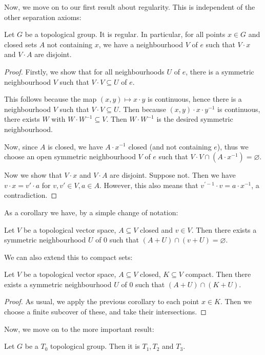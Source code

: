 \documentclass[twoside,symmetric, openany, 12pt]{./tuftebook}
\theoremstyle{definition}
\theoremstyle{definition}
\theoremstyle{definition}
\begin{document}
Now, we move on to our first result about regularity. This is independent of the other separation axioms:
\begin{Theorem}
	Let $G$ be a topological group. It is regular. In particular, for all points $x\in G$ and closed sets $A$ not containing $x$, we have a neighbourhood $V$ of $e$ such that $V\cdot x$ and $V\cdot A$ are disjoint.
\end{Theorem}
\begin{proof}
Firstly, we show that for all neighbourhoods $U$ of $e$, there is a symmetric neighbourhood $V$ such that $V\cdot V\subseteq U$ of $e$.	

This follows because the map $(x,y)\mapsto x\cdot y$ is continuous, hence there is a neighbourhood $V$ such that $V\cdot V\subseteq U$. Then because $(x,y)\cdot x\cdot y^{-1}$ is continuous, there exists $W$ with $W\cdot W^{-1}\subseteq V$. Then $W \cdot W^{-1}$ is the desired symmetric neighbourhood.

Now, since $A$ is closed, we have $A\cdot x^{-1}$ closed (and not containing $e$), thus we choose an open symmetric neighbourhood $V$ of $e$ such that $V\cdot V\cap (A \cdot x^{-1})=\varnothing$.

Now we show that $V\cdot x$ and $V \cdot A$ are disjoint. Suppose not. Then we have $v\cdot x=v'\cdot a$ for $v,v'\in V,a\in A$. However, this also means that $v^{\prime-1}\cdot v = a \cdot x^{-1}$, a contradiction.
\end{proof}
As a corollary we have, by a simple change of notation:
\begin{Corollary}
	Let $V$ be a topological vector space, $A\subseteq V$ closed and $v\in V$. Then there exists a symmetric neighbourhood $U$ of $0$ such that $(A+U)\cap (v+U)=\varnothing$.
\end{Corollary}
We can also extend this to compact sets:
\begin{Corollary}\label{cor:compacttranslates}
	Let $V$ be a topological vector space, $A\subseteq V$ closed, $K\subseteq V$ compact. Then there exists a symmetric neighbourhood $U$ of $0$ such that $(A+U)\cap (K+U)$.
\end{Corollary}
\begin{proof}
	As usual, we apply the previous corollary to each point $x\in K$. Then we choose a finite subcover of these, and take their intersections.
\end{proof}
Now, we move on to the more important result:
	\begin{Theorem}
		Let $G$ be a $T_0$ topological group. Then it is $T_1, T_2$ and $T_3$.
	\end{Theorem} 
\end{document}
